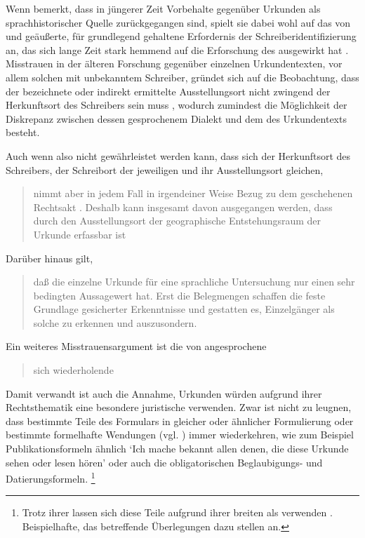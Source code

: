 Wenn \citeauthor{schulze2011} bemerkt, dass in jüngerer Zeit
Vorbehalte gegenüber Urkunden als sprachhistorischer
Quelle zurückgegangen sind, spielt sie dabei wohl auf das von
\citet[23--33]{boesch1946} und \citet[389]{haacke1955} geäußerte, für
grundlegend gehaltene Erfordernis der
Schrei\-ber\-identifizierung an, das sich lange
Zeit stark hemmend auf die Erforschung des \CAO{} ausgewirkt hat
\autocite[21--22]{schulze2011}. Misstrauen in der älteren
Forschung gegenüber einzelnen Urkunden\-texten, vor allem solchen mit
unbekanntem Schreiber, gründet sich auf die Beobachtung, dass der bezeichnete
oder indirekt ermittelte Ausstellungsort nicht zwingend der Herkunftsort des
Schreibers sein muss \autocite[16]{schulze2011}, wodurch zumindest die
Möglichkeit der Diskrepanz zwischen dessen gesprochenem Dialekt und dem
 des Urkundentexts besteht.

Auch wenn also nicht gewährleistet werden kann, dass sich der Herkunftsort des
Schreibers, der Schreibort der jeweiligen
 und ihr Ausstellungsort gleichen,
\blockcquote[331--332]{ganslmayeretal2003}{nimmt 
aber in jedem Fall in irgendeiner Weise Bezug zu dem geschehenen Rechtsakt
\textelp{}. Deshalb kann insgesamt davon ausgegangen werden, dass durch den
Ausstellungsort der geographische Entstehungsraum der
Urkunde erfassbar ist}. Darüber hinaus gilt, \blockcquote[122]{deboor1974}{daß
die einzelne Urkunde für eine sprachliche Untersuchung nur einen sehr bedingten
Aussagewert hat. Erst die Belegmengen schaffen die feste Grundlage gesicherter
Erkenntnisse und gestatten es, Einzelgänger als solche zu erkennen und
auszusondern.}

Ein weiteres Misstrauensargument ist die von
\citet[1311]{wegera2000} angesprochene \blockquote{sich wiederholende
}. Damit verwandt ist auch die Annahme,
Urkunden würden aufgrund ihrer Rechtsthematik eine besondere
juristische  verwenden. Zwar ist nicht zu leugnen, dass
bestimmte Teile des Formulars in gleicher oder ähnlicher Formulierung oder
bestimmte formelhafte Wendungen (vgl. ) immer
wiederkehren, wie zum Beispiel Publikationsformeln ähnlich  `Ich mache bekannt allen
denen, die diese Urkunde sehen oder lesen hören' oder auch die obligatorischen
Beglaubigungs- und Datierungsformeln.%
%
	\footnote{%
	Trotz ihrer  lassen sich diese Teile aufgrund ihrer
	breiten  als  verwenden
	\autocite[siehe][]{cysouwwaelchli2007}. Beispielhafte, das \CAO{}
	betreffende Überlegungen dazu stellen
	\citet[174--175]{beckerschallert2022b} an.}

